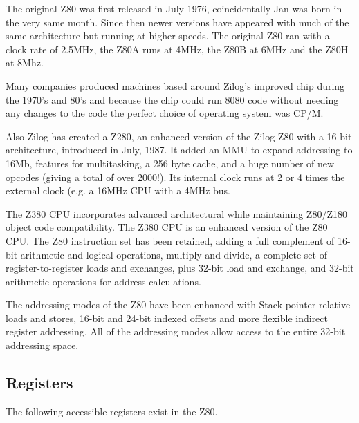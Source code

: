 \documentclass[12pt,twoside,openright,a4paper]{book}
\begin{document}
The original Z80 was first released in July 1976, coincidentally Jan was born in the very same month. Since then newer versions have appeared with much of the same architecture but running at higher speeds. The original Z80 ran with a clock rate of 2.5MHz, the Z80A runs at 4MHz, the Z80B at 6MHz and the Z80H at 8Mhz. 

Many companies produced machines based around Zilog's improved chip during the 1970's and 80's and because the chip could run 8080 code without needing any changes to the code the perfect choice of operating system was CP/M. 

Also Zilog has created a Z280, an enhanced version of the Zilog Z80 with a 16 bit architecture, introduced in July, 1987. It added an MMU to expand addressing to 16Mb, features for multitasking, a 256 byte cache, and a huge number of new opcodes (giving a total of over 2000!). Its internal clock runs at 2 or 4 times the external clock (e.g. a 16MHz CPU with a 4MHz bus.

The Z380 CPU incorporates advanced architectural while maintaining Z80/Z180 object code compatibility. The Z380 CPU is an enhanced version of the Z80 CPU. The Z80 instruction set has been retained, adding a full complement of 16-bit arithmetic and logical operations, multiply and divide, a complete set of register-to-register loads and exchanges, plus 32-bit load and exchange, and 32-bit arithmetic operations for address calculations.

The addressing modes of the Z80 have been enhanced with Stack pointer relative loads and stores, 16-bit and 24-bit indexed offsets and more flexible indirect register addressing. All of the addressing modes allow access to the entire 32-bit addressing space.


\subsection{Registers}

The following accessible registers exist in the Z80.

\newcommand{\RegDesc}[2]{\rdelim\}{#1}{1ex}[#2]}
\end{document}
